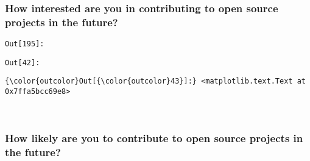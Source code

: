 \documentclass[11pt]{article}
\begin{document}
    \subsubsection{How interested are you in contributing to open source
projects in the
future?}\label{how-interested-are-you-in-contributing-to-open-source-projects-in-the-future}

\texttt{\color{outcolor}Out[{\color{outcolor}195}]:}
    

    

\texttt{\color{outcolor}Out[{\color{outcolor}42}]:}
    

    


            \begin{Verbatim}[commandchars=\\\{\}]
{\color{outcolor}Out[{\color{outcolor}43}]:} <matplotlib.text.Text at 0x7ffa5bcc69e8>
\end{Verbatim}
        
    \begin{center}
    \end{center}
    { \hspace*{\fill} \\}
    
    \subsubsection{How likely are you to contribute to open source projects
in the
future?}\label{how-likely-are-you-to-contribute-to-open-source-projects-in-the-future}
\end{document}
